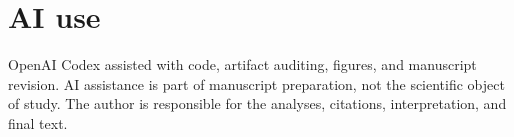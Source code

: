 \documentclass{article}
\begin{document}
\section*{AI use}
OpenAI Codex assisted with code, artifact auditing, figures, and manuscript revision. AI assistance is part of manuscript preparation, not the scientific object of study. The author is responsible for the analyses, citations, interpretation, and final text.



\clearpage
\appendix

\end{document}
